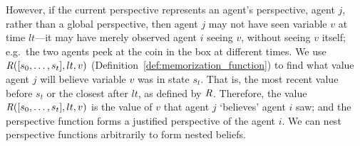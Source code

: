However, if the current perspective represents an agent's perspective, agent $j$, rather than a global perspective, then agent $j$ may not have seen variable $v$ at time $lt$---it may have merely observed agent $i$ seeing $v$, without seeing $v$ itself; e.g.\ the two agents peek at the coin in the box at different times. We use $\mathit{R}([s_0,\ldots,s_t], lt, v)$ (Definition~\ref{def:memorization_function}) to find what value agent $j$ will believe variable $v$ was in state $s_t$. That is, the most recent value before $s_t$ or the closest after $lt$, as defined by $\mathit{R}$. Therefore, the value $\mathit{R}([s_0,\ldots,s_t], lt, v)$ is the value of $v$ that agent $j$ `believes' agent $i$ saw;
and the perspective function forms a justified perspective of the agent $i$. We can nest perspective functions arbitrarily to form nested beliefs.








  



 
